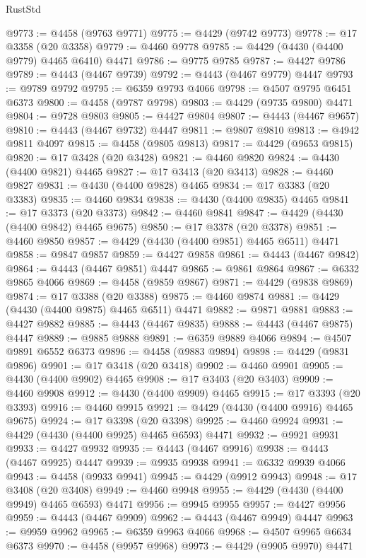 \begin{lexlean}{RustStd}
\begin{coremodule}
@9773 := @4458 (@9763 @9771)
@9775 := @4429 (@9742 @9773)
@9778 := @17 @3358 (@20 @3358)
@9779 := @4460 @9778
@9785 := @4429 (@4430 (@4400 @9779) @4465 @6410) @4471
@9786 := @9775 @9785
@9787 := @4427 @9786
@9789 := @4443 (@4467 @9739)
@9792 := @4443 (@4467 @9779) @4447
@9793 := @9789 @9792
@9795 := @6359 @9793 @4066
@9798 := @4507 @9795 @6451 @6373
@9800 := @4458 (@9787 @9798)
@9803 := @4429 (@9735 @9800) @4471
@9804 := @9728 @9803
@9805 := @4427 @9804
@9807 := @4443 (@4467 @9657)
@9810 := @4443 (@4467 @9732) @4447
@9811 := @9807 @9810
@9813 := @4942 @9811 @4097
@9815 := @4458 (@9805 @9813)
@9817 := @4429 (@9653 @9815)
@9820 := @17 @3428 (@20 @3428)
@9821 := @4460 @9820
@9824 := @4430 (@4400 @9821) @4465
@9827 := @17 @3413 (@20 @3413)
@9828 := @4460 @9827
@9831 := @4430 (@4400 @9828) @4465
@9834 := @17 @3383 (@20 @3383)
@9835 := @4460 @9834
@9838 := @4430 (@4400 @9835) @4465
@9841 := @17 @3373 (@20 @3373)
@9842 := @4460 @9841
@9847 := @4429 (@4430 (@4400 @9842) @4465 @9675)
@9850 := @17 @3378 (@20 @3378)
@9851 := @4460 @9850
@9857 := @4429 (@4430 (@4400 @9851) @4465 @6511) @4471
@9858 := @9847 @9857
@9859 := @4427 @9858
@9861 := @4443 (@4467 @9842)
@9864 := @4443 (@4467 @9851) @4447
@9865 := @9861 @9864
@9867 := @6332 @9865 @4066
@9869 := @4458 (@9859 @9867)
@9871 := @4429 (@9838 @9869)
@9874 := @17 @3388 (@20 @3388)
@9875 := @4460 @9874
@9881 := @4429 (@4430 (@4400 @9875) @4465 @6511) @4471
@9882 := @9871 @9881
@9883 := @4427 @9882
@9885 := @4443 (@4467 @9835)
@9888 := @4443 (@4467 @9875) @4447
@9889 := @9885 @9888
@9891 := @6359 @9889 @4066
@9894 := @4507 @9891 @6552 @6373
@9896 := @4458 (@9883 @9894)
@9898 := @4429 (@9831 @9896)
@9901 := @17 @3418 (@20 @3418)
@9902 := @4460 @9901
@9905 := @4430 (@4400 @9902) @4465
@9908 := @17 @3403 (@20 @3403)
@9909 := @4460 @9908
@9912 := @4430 (@4400 @9909) @4465
@9915 := @17 @3393 (@20 @3393)
@9916 := @4460 @9915
@9921 := @4429 (@4430 (@4400 @9916) @4465 @9675)
@9924 := @17 @3398 (@20 @3398)
@9925 := @4460 @9924
@9931 := @4429 (@4430 (@4400 @9925) @4465 @6593) @4471
@9932 := @9921 @9931
@9933 := @4427 @9932
@9935 := @4443 (@4467 @9916)
@9938 := @4443 (@4467 @9925) @4447
@9939 := @9935 @9938
@9941 := @6332 @9939 @4066
@9943 := @4458 (@9933 @9941)
@9945 := @4429 (@9912 @9943)
@9948 := @17 @3408 (@20 @3408)
@9949 := @4460 @9948
@9955 := @4429 (@4430 (@4400 @9949) @4465 @6593) @4471
@9956 := @9945 @9955
@9957 := @4427 @9956
@9959 := @4443 (@4467 @9909)
@9962 := @4443 (@4467 @9949) @4447
@9963 := @9959 @9962
@9965 := @6359 @9963 @4066
@9968 := @4507 @9965 @6634 @6373
@9970 := @4458 (@9957 @9968)
@9973 := @4429 (@9905 @9970) @4471

\end{coremodule}
\end{lexlean}
